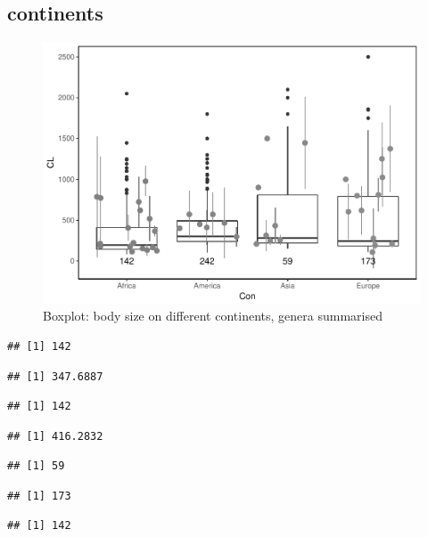 \documentclass[]{article}
\begin{document}
\newpage

\subsection{continents}\label{continents-1}

\begin{figure}[htbp]
\centering
\includegraphics{MA_JJ_files/figure-latex/BPCon-1.pdf}
\caption{Boxplot: body size on different continents, genera summarised}
\end{figure}

\begin{verbatim}
## [1] 142
\end{verbatim}

\begin{verbatim}
## [1] 347.6887
\end{verbatim}

\begin{verbatim}
## [1] 142
\end{verbatim}

\begin{verbatim}
## [1] 416.2832
\end{verbatim}

\begin{verbatim}
## [1] 59
\end{verbatim}

\begin{verbatim}
## [1] 173
\end{verbatim}

\begin{verbatim}
## [1] 142
\end{verbatim}
\end{document}
